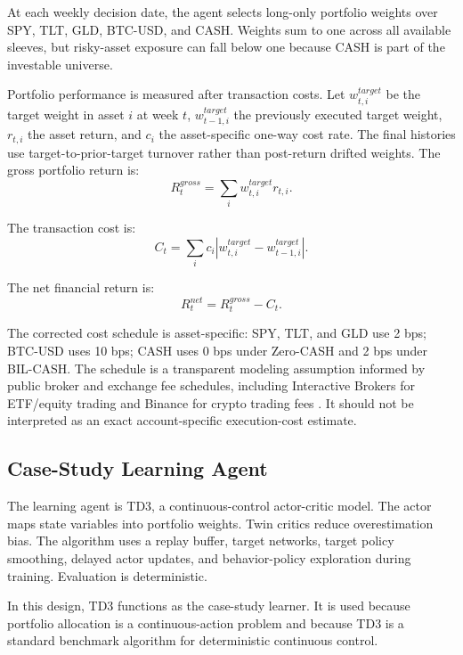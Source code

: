 \documentclass[11pt]{article}
\newcommand{\cashzero}{Zero-CASH}
\newcommand{\cashbil}{BIL-CASH}
\begin{document}
At each weekly decision date, the agent selects long-only portfolio weights over SPY, TLT, GLD, BTC-USD, and CASH. Weights sum to one across all available sleeves, but risky-asset exposure can fall below one because CASH is part of the investable universe.

Portfolio performance is measured after transaction costs. Let \(w_{t,i}^{target}\) be the target weight in asset \(i\) at week \(t\), \(w_{t-1,i}^{target}\) the previously executed target weight, \(r_{t,i}\) the asset return, and \(c_i\) the asset-specific one-way cost rate. The final histories use target-to-prior-target turnover rather than post-return drifted weights. The gross portfolio return is:
\begin{equation}
R^{gross}_t = \sum_i w^{target}_{t,i} r_{t,i}.
\end{equation}

The transaction cost is:
\begin{equation}
C_t = \sum_i c_i \left|w^{target}_{t,i} - w^{target}_{t-1,i}\right|.
\end{equation}

The net financial return is:
\begin{equation}
R^{net}_t = R^{gross}_t - C_t.
\end{equation}

The corrected cost schedule is asset-specific: SPY, TLT, and GLD use 2 bps; BTC-USD uses 10 bps; CASH uses 0 bps under \cashzero{} and 2 bps under \cashbil{}. The schedule is a transparent modeling assumption informed by public broker and exchange fee schedules, including Interactive Brokers for ETF/equity trading and Binance for crypto trading fees \citep{interactivebrokers2026commissions,binance2026tradingfees}. It should not be interpreted as an exact account-specific execution-cost estimate.

\subsection{Case-Study Learning Agent}

The learning agent is TD3, a continuous-control actor-critic model. The actor maps state variables into portfolio weights. Twin critics reduce overestimation bias. The algorithm uses a replay buffer, target networks, target policy smoothing, delayed actor updates, and behavior-policy exploration during training. Evaluation is deterministic.

In this design, TD3 functions as the case-study learner. It is used because portfolio allocation is a continuous-action problem and because TD3 is a standard benchmark algorithm for deterministic continuous control.
\end{document}
